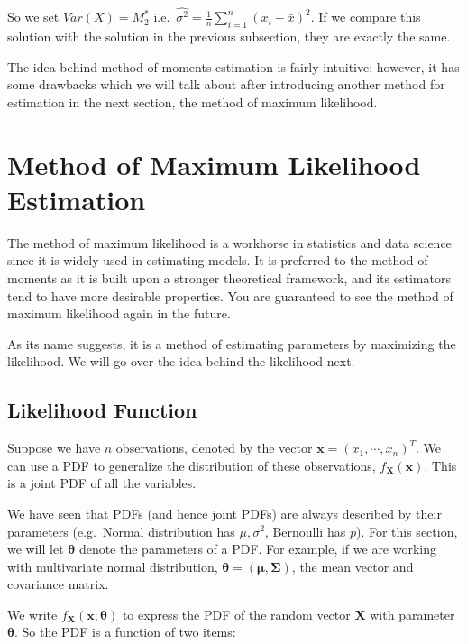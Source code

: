 \documentclass[
]{book}
\begin{document}
So we set \(Var(X) = M_2^*\) i.e.~\(\hat{\sigma^2} = \frac{1}{n} \sum_{i=1}^n (x_i - \bar{x})^2\). If we compare this solution with the solution in the previous subsection, they are exactly the same.

The idea behind method of moments estimation is fairly intuitive; however, it has some drawbacks which we will talk about after introducing another method for estimation in the next section, the method of maximum likelihood.

\hypertarget{MLE}{%
\section{Method of Maximum Likelihood Estimation}\label{MLE}}

The method of maximum likelihood is a workhorse in statistics and data science since it is widely used in estimating models. It is preferred to the method of moments as it is built upon a stronger theoretical framework, and its estimators tend to have more desirable properties. You are guaranteed to see the method of maximum likelihood again in the future.

As its name suggests, it is a method of estimating parameters by maximizing the likelihood. We will go over the idea behind the likelihood next.

\hypertarget{likelihood-function}{%
\subsection{Likelihood Function}\label{likelihood-function}}

Suppose we have \(n\) observations, denoted by the vector \(\boldsymbol{x} = (x_1, \cdots, x_n)^{T}\). We can use a PDF to generalize the distribution of these observations, \(f_{\boldsymbol{X}}(\boldsymbol{x})\). This is a joint PDF of all the variables.

We have seen that PDFs (and hence joint PDFs) are always described by their parameters (e.g.~Normal distribution has \(\mu, \sigma^2\), Bernoulli has \(p\)). For this section, we will let \(\boldsymbol{\theta}\) denote the parameters of a PDF. For example, if we are working with multivariate normal distribution, \(\boldsymbol{\theta} = (\boldsymbol{\mu}, \boldsymbol{\Sigma})\), the mean vector and covariance matrix.

We write \(f_{\boldsymbol{X}}(\boldsymbol{x}; \boldsymbol{\theta})\)
to express the PDF of the random vector \(\boldsymbol{X}\) with parameter \(\boldsymbol{\theta}\). So the PDF is a function of two items:
\end{document}
